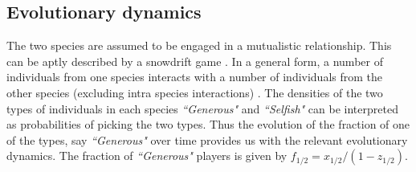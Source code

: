 \documentclass{pnastwo}
\begin{document}
\begin{article}
\subsection{Evolutionary dynamics}
The two species are assumed to be engaged in a mutualistic relationship. This can be aptly described by a snowdrift game \cite{souza:JTB:2009}. In a general form, a number of individuals from one species interacts with a number of individuals from the other species (excluding intra species interactions) \cite{gokhale:PRSB:2012}. 
The densities of the two types of individuals in each species \textit{``Generous"} and \textit{``Selfish"} can be interpreted as probabilities of picking the two types. Thus the evolution of the fraction of one of the types, say \textit{``Generous"} over time provides us with the relevant evolutionary dynamics. The fraction of \textit{``Generous"} players is given by $f_{1/2} = x_{1/2} / (1- z_{1/2} )$.


\end{article}
\end{document}
